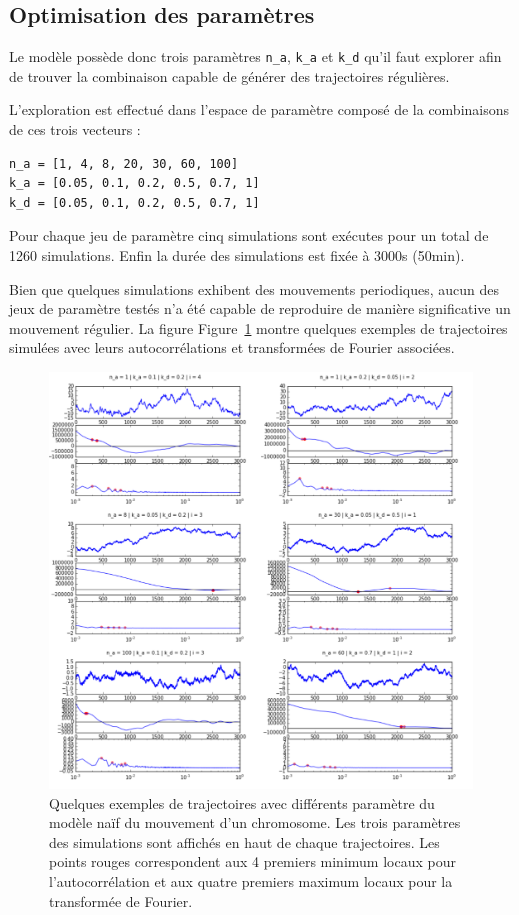 \documentclass[12pt,a4paper,twoside,openright]{book}
\begin{document}
\subsection{Optimisation des
paramètres}\label{optimisation-des-paramuxe8tres}

Le modèle possède donc trois paramètres \texttt{n\_a}, \texttt{k\_a} et
\texttt{k\_d} qu'il faut explorer afin de trouver la combinaison capable
de générer des trajectoires régulières.

L'exploration est effectué dans l'espace de paramètre composé de la
combinaisons de ces trois vecteurs :

\begin{verbatim}
n_a = [1, 4, 8, 20, 30, 60, 100]
k_a = [0.05, 0.1, 0.2, 0.5, 0.7, 1]
k_d = [0.05, 0.1, 0.2, 0.5, 0.7, 1]
\end{verbatim}

Pour chaque jeu de paramètre cinq simulations sont exécutes pour un
total de 1260 simulations. Enfin la durée des simulations est fixée à
3000s (50min).

Bien que quelques simulations exhibent des mouvements periodiques, aucun
des jeux de paramètre testés n'a été capable de reproduire de manière
significative un mouvement régulier. La figure
Figure~\ref{fig:simu-oscill-all} montre quelques exemples de
trajectoires simulées avec leurs autocorrélations et transformées de
Fourier associées.

\begin{figure}[htbp]
\centering
\includegraphics{figures/annexes/simu_oscill_all.png}
\caption[Quelques exemples de trajectoires avec différents paramètre du modèle naïf du mouvement d'un chromosome]{\label{fig:simu-oscill-all}Quelques
exemples de trajectoires avec différents paramètre du modèle naïf du
mouvement d'un chromosome. Les trois paramètres des simulations sont
affichés en haut de chaque trajectoires. Les points rouges correspondent
aux 4 premiers minimum locaux pour l'autocorrélation et aux quatre
premiers maximum locaux pour la transformée de Fourier.}
\end{figure}
\end{document}
